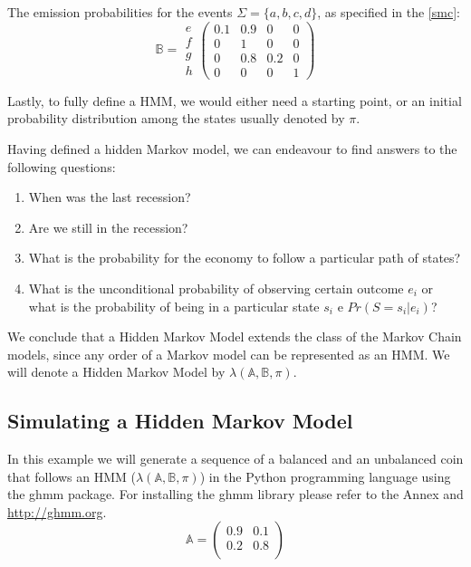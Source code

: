 \documentclass[a4paper,12pt]{article}
\theoremstyle{definition}
\begin{document}
The emission probabilities for the events $\Sigma = \{a,b,c,d\}$, as specified in the \ref{smc}:
\[ \mathbb{B} = 
\begin{array}{c} e \\ f \\ g \\ h \end{array}
\begin{pmatrix} 
0.1 & 0.9 & 0 & 0 \\
0   & 1   & 0 & 0 \\
0 & 0.8 & 0.2 & 0 \\
0 & 0& 0& 1
\end{pmatrix} \]

Lastly, to fully define a HMM, we would either need a starting point, or an initial probability distribution among the states usually denoted by $\pi$. 

Having defined a hidden Markov model, we can endeavour to find answers to the following questions:
\begin{enumerate}
\item When was the last recession?
\item Are we still in the recession?
\item  What is the probability for the economy to follow a particular path of states?
\item What is the unconditional probability of observing certain outcome $e_i $ or what is the probability of being in a particular state $s_i$ e $Pr(S=s_i | e_i)$?
\end{enumerate}

We conclude that a Hidden Markov Model extends the class of the Markov Chain models, since any order of a Markov model can be represented as an HMM. 
We will denote a Hidden Markov Model by $\lambda(\mathbb{A},\mathbb{B},\pi)$.
\subsection{Simulating a Hidden Markov Model}
In this example we will generate a sequence of a balanced and an unbalanced coin that follows an HMM ($\lambda(\mathbb{A}, \mathbb{B}, \pi)$) in the Python programming language using the ghmm package. For installing the ghmm library please refer to the Annex and \href{http://ghmm.org}{http://ghmm.org}. 
\begin{equation}
\mathbb{A}= \left(\begin{array}{cc}
0.9 & 0.1 \\
0.2 & 0.8 \\
\end{array}\right)
\end{equation}
\end{document}
